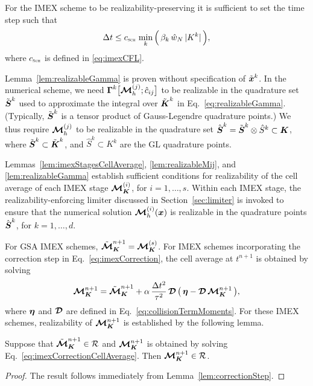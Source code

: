\begin{rem}
  For the IMEX scheme to be realizability-preserving it is sufficient to set the time step such that
  \begin{equation}
    \Delta t \le c_{\textnormal{\tiny\textsc{Sch}}}\,\min_{k} \Big(\, \beta_{k}\,\hat{w}_{N}\,|K^{k}| \,\Big),
    \label{eq:imexTimeStep}
  \end{equation}
  where $c_{\textnormal{\tiny\textsc{Sch}}}$ is defined in \eqref{eq:imexCFL}.  
\end{rem}

\begin{rem}
  Lemma~\eqref{lem:realizableGamma} is proven without specification of $\tilde{\boldsymbol{x}}^{k}$.  
  In the numerical scheme, we need $\boldsymbol{\Gamma}^{k}\big[\boldsymbol{\mathcal{M}}_{h}^{(j)};\hat{c}_{ij}\big]$ to be realizable in the quadrature set $\tilde{\boldsymbol{S}}^{k}$ used to approximate the integral over $\tilde{\boldsymbol{K}}^{k}$ in Eq.~\eqref{eq:realizableGamma}.  
  (Typically, $\tilde{\boldsymbol{S}}^{k}$ is a tensor product of Gauss-Legendre quadrature points.)  
  We thus require $\boldsymbol{\mathcal{M}}_{h}^{(j)}$ to be realizable in the quadrature set $\hat{\boldsymbol{S}}^{k}=\tilde{\boldsymbol{S}}^{k}\otimes\hat{S}^{k}\subset\boldsymbol{K}$, where $\tilde{\boldsymbol{S}}^{k}\subset\tilde{\boldsymbol{K}}^{k}$, and $\hat{S}^{k}\subset K^{k}$ are the GL quadrature points.  
\end{rem}

\begin{rem}
  Lemmas~\ref{lem:imexStagesCellAverage}, \ref{lem:realizableMij}, and \ref{lem:realizableGamma} establish sufficient conditions for realizability of the cell average of each IMEX stage $\boldsymbol{\mathcal{M}}_{\boldsymbol{K}}^{(i)}$, for $i=1,\ldots,s$.  
  Within each IMEX stage, the realizability-enforcing limiter discussed in Section~\ref{sec:limiter} is invoked to ensure that the numerical solution $\boldsymbol{\mathcal{M}}_{h}^{(i)}(\boldsymbol{x})$ is realizable in the quadrature points $\hat{\boldsymbol{S}}^{k}$, for $k=1,\ldots,d$.  
\end{rem}

For GSA IMEX schemes, $\tilde{\boldsymbol{\mathcal{M}}}_{\boldsymbol{K}}^{n+1}=\boldsymbol{\mathcal{M}}_{\boldsymbol{K}}^{(s)}$.  
For IMEX schemes incorporating the correction step in Eq.~\eqref{eq:imexCorrection}, the cell average at $t^{n+1}$ is obtained by solving
\begin{equation}
  \boldsymbol{\mathcal{M}}_{\boldsymbol{K}}^{n+1}=\tilde{\boldsymbol{\mathcal{M}}}_{\boldsymbol{K}}^{n+1}+\alpha\,\frac{\Delta t^{2}}{\tau^{2}}\,\boldsymbol{\mathcal{D}}\,\big(\,\boldsymbol{\eta}-\boldsymbol{\mathcal{D}}\,\boldsymbol{\mathcal{M}}_{\boldsymbol{K}}^{n+1}\,\big),
  \label{eq:imexCorrectionCellAverage}
\end{equation}
where $\boldsymbol{\eta}$ and $\boldsymbol{\mathcal{D}}$ are defined in Eq.~\eqref{eq:collisionTermMoments}.  
For these IMEX schemes, realizability of $\boldsymbol{\mathcal{M}}_{\boldsymbol{K}}^{n+1}$ is established by the following lemma.  
\begin{lemma}
  Suppose that $\tilde{\boldsymbol{\mathcal{M}}}_{\boldsymbol{K}}^{n+1}\in\mathcal{R}$ and $\boldsymbol{\mathcal{M}}_{\boldsymbol{K}}^{n+1}$ is obtained by solving Eq.~\eqref{eq:imexCorrectionCellAverage}.  
  Then $\boldsymbol{\mathcal{M}}_{\boldsymbol{K}}^{n+1}\in\mathcal{R}$.  
  \label{lem:imexCorrectionCellAverage}
\end{lemma}
\begin{proof}
  The result follows immediately from Lemma~\ref{lem:correctionStep}.  
\end{proof}

